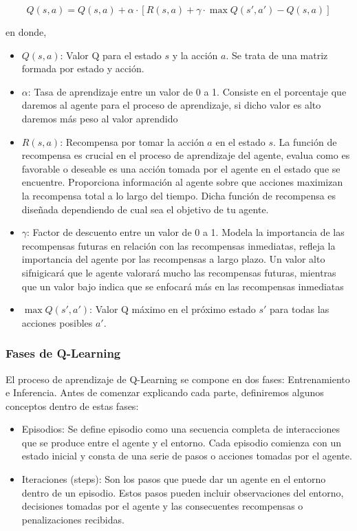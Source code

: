   \begin{equation} 
    Q(s, a) = Q(s, a) + \alpha \cdot [R(s, a) + \gamma \cdot \max Q(s', a') - Q(s, a)]
  \end{equation} 

  en donde, 

  \begin{itemize}
    \item $Q(s, a)$: Valor Q para el estado $s$ y la acción $a$. Se trata de una matriz formada por estado y acción.
    \item $\alpha$: Tasa de aprendizaje entre un valor de 0 a 1. Consiste en el porcentaje que daremos al agente para el proceso de aprendizaje, si dicho valor es alto daremos más peso al valor aprendido 
    \item $R(s, a)$: Recompensa por tomar la acción $a$ en el estado $s$. La función de recompensa es crucial en el proceso de aprendizaje del agente, evalua como es favorable o deseable
    es una acción tomada por el agente en el estado que se encuentre. Proporciona información al agente sobre que acciones maximizan la recompensa total a lo largo del tiempo. Dicha función
    de recompensa es diseñada dependiendo de cual sea el objetivo de tu agente. 
    \item $\gamma$: Factor de descuento entre un valor de 0 a 1. Modela la importancia de las recompensas futuras en relación con las recompensas inmediatas, refleja la importancia del agente
    por las recompensas a largo plazo. Un valor alto sifnigicará que le agente valorará mucho las recompensas futuras, mientras que un valor bajo indica que se enfocará más en las recompensas
    inmediatas
    \item $\max Q(s', a')$: Valor Q máximo en el próximo estado $s'$ para todas las acciones posibles $a'$.
\end{itemize}

\subsubsection{Fases de Q-Learning}
\label{sec:fases_ql}
 El proceso de aprendizaje de Q-Learning se compone en dos fases: Entrenamiento e Inferencia. 
 Antes de comenzar explicando cada parte, definiremos algunos conceptos dentro de estas fases: 
 \begin{itemize}
  \item Episodios: Se define episodio como una secuencia completa de interacciones que se produce entre el agente y el entorno. Cada episodio comienza con un estado inicial y consta de una serie 
  de pasos o acciones tomadas por el agente.
  \item Iteraciones (steps): Son los pasos que puede dar un agente en el entorno dentro de un episodio. Estos pasos pueden incluir observaciones del entorno, decisiones tomadas por el agente
  y las consecuentes recompensas o penalizaciones recibidas.
\end{itemize}


